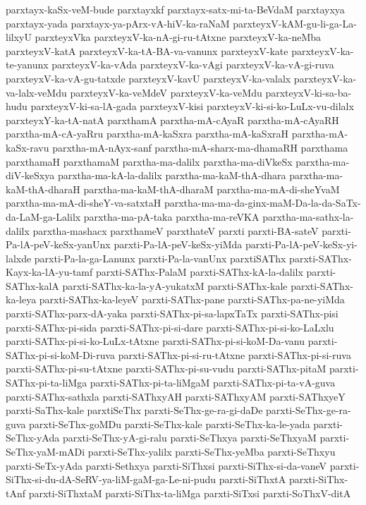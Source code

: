 {parxtayx-kaSx-veM-bude
parxtayxkf
parxtayx-satx-mi-ta-BeVdaM
parxtayxya
parxtayx-yada
parxtayx-ya-pArx-vA-hiV-ka-raNaM
parxteyxV-kAM-gu-li-ga-La-lilxyU
parxteyxVka
parxteyxV-ka-nA-gi-ru-tAtxne
parxteyxV-ka-neMba
parxteyxV-katA
parxteyxV-ka-tA-BA-va-vanunx
parxteyxV-kate
parxteyxV-ka-te-yanunx
parxteyxV-ka-vAda
parxteyxV-ka-vAgi
parxteyxV-ka-vA-gi-ruva
parxteyxV-ka-vA-gu-tatxde
parxteyxV-kavU
parxteyxV-ka-valalx
parxteyxV-ka-va-lalx-veMdu
parxteyxV-ka-veMdeV
parxteyxV-ka-veMdu
parxteyxV-ki-sa-ba-hudu
parxteyxV-ki-sa-lA-gada
parxteyxV-kisi
parxteyxV-ki-si-ko-LuLx-vu-dilalx
parxteyxY-ka-tA-natA
parxthamA
parxtha-mA-cAyaR
parxtha-mA-cAyaRH
parxtha-mA-cA-yaRru
parxtha-mA-kaSxra
parxtha-mA-kaSxraH
parxtha-mA-kaSx-ravu
parxtha-mA-nAyx-sanf
parxtha-mA-sharx-ma-dhamaRH
parxthama
parxthamaH
parxthamaM
parxtha-ma-dalilx
parxtha-ma-diVkeSx
parxtha-ma-diV-keSxya
parxtha-ma-kA-la-dalilx
parxtha-ma-kaM-thA-dhara
parxtha-ma-kaM-thA-dharaH
parxtha-ma-kaM-thA-dharaM
parxtha-ma-mA-di-sheYvaM
parxtha-ma-mA-di-sheY-va-satxtaH
parxtha-ma-ma-da-ginx-maM-Da-la-da-SaTx-da-LaM-ga-Lalilx
parxtha-ma-pA-taka
parxtha-ma-reVKA
parxtha-ma-sathx-la-dalilx
parxtha-mashacx
parxthameV
parxthateV
parxti
parxti-BA-sateV
parxti-Pa-lA-peV-keSx-yanUnx
parxti-Pa-lA-peV-keSx-yiMda
parxti-Pa-lA-peV-keSx-yi-lalxde
parxti-Pa-la-ga-Lanunx
parxti-Pa-la-vanUnx
parxtiSAThx
parxti-SAThx-Kayx-ka-lA-yu-tamf
parxti-SAThx-PalaM
parxti-SAThx-kA-la-dalilx
parxti-SAThx-kalA
parxti-SAThx-ka-la-yA-yukatxM
parxti-SAThx-kale
parxti-SAThx-ka-leya
parxti-SAThx-ka-leyeV
parxti-SAThx-pane
parxti-SAThx-pa-ne-yiMda
parxti-SAThx-parx-dA-yaka
parxti-SAThx-pi-sa-lapxTaTx
parxti-SAThx-pisi
parxti-SAThx-pi-sida
parxti-SAThx-pi-si-dare
parxti-SAThx-pi-si-ko-LaLxlu
parxti-SAThx-pi-si-ko-LuLx-tAtxne
parxti-SAThx-pi-si-koM-Da-vanu
parxti-SAThx-pi-si-koM-Di-ruva
parxti-SAThx-pi-si-ru-tAtxne
parxti-SAThx-pi-si-ruva
parxti-SAThx-pi-su-tAtxne
parxti-SAThx-pi-su-vudu
parxti-SAThx-pitaM
parxti-SAThx-pi-ta-liMga
parxti-SAThx-pi-ta-liMgaM
parxti-SAThx-pi-ta-vA-guva
parxti-SAThx-sathxla
parxti-SAThxyAH
parxti-SAThxyAM
parxti-SAThxyeY
parxti-SaThx-kale
parxtiSeThx
parxti-SeThx-ge-ra-gi-daDe
parxti-SeThx-ge-ra-guva
parxti-SeThx-goMDu
parxti-SeThx-kale
parxti-SeThx-ka-le-yada
parxti-SeThx-yAda
parxti-SeThx-yA-gi-ralu
parxti-SeThxya
parxti-SeThxyaM
parxti-SeThx-yaM-mADi
parxti-SeThx-yalilx
parxti-SeThx-yeMba
parxti-SeThxyu
parxti-SeTx-yAda
parxti-Sethxya
parxti-SiThxsi
parxti-SiThx-si-da-vaneV
parxti-SiThx-si-du-dA-SeRV-ya-liM-gaM-ga-Le-ni-pudu
parxti-SiThxtA
parxti-SiThx-tAnf
parxti-SiThxtaM
parxti-SiThx-ta-liMga
parxti-SiTxsi
parxti-SoThxV-ditA
}
